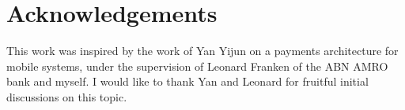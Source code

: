 \documentclass[runningheads,envcountsame,envcountsect,oribibl]{llncs}
\begin{document}
\section{Acknowledgements}

This work was inspired by the work of Yan Yijun on a payments architecture for
mobile systems, under the supervision of Leonard Franken of the ABN AMRO bank
and myself. I would like to thank Yan and Leonard for fruitful initial
discussions on this topic.
 


\end{document}
